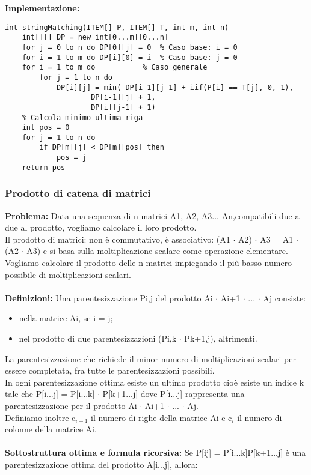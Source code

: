 \documentclass[../cheatSheetAlgoritmi.tex]{subfiles}
\begin{document}
\textbf{Implementazione:}
\begin{lstlisting}[caption=String matching approssimato]
int stringMatching(ITEM[] P, ITEM[] T, int m, int n)
	int[][] DP = new int[0...m][0...n]
	for j = 0 to n do DP[0][j] = 0  % Caso base: i = 0
	for i = 1 to m do DP[i][0] = i  % Caso base: j = 0
	for i = 1 to m do        	% Caso generale 
		for j = 1 to n do
			DP[i][j] = min( DP[i-1][j-1] + iif(P[i] == T[j], 0, 1),	
					DP[i-1][j] + 1,
					DP[i][j-1] + 1)
	% Calcola minimo ultima riga
	int pos = 0 
	for j = 1 to n do
		if DP[m][j] < DP[m][pos] then
			pos = j
	return pos
\end{lstlisting}
\subsubsection{Prodotto di catena di matrici}
\textbf{Problema:} Data una sequenza di n matrici A1, A2, A3... An,compatibili due a due al prodotto, vogliamo calcolare il loro prodotto. \\Il prodotto di matrici: non è commutativo, è associativo: (A1 $\cdot$ A2) $\cdot$ A3 = A1 $\cdot$ (A2 $\cdot$ A3) e si basa sulla moltiplicazione scalare come operazione elementare. Vogliamo calcolare il prodotto delle n matrici impiegando il più basso numero possibile di moltiplicazioni scalari.\\\\
\textbf{Definizioni:} Una parentesizzazione Pi,j del prodotto Ai $\cdot$ Ai+1 $\cdot$ ... $\cdot$ Aj consiste:
\begin{itemize}
	\item nella matrice Ai, se i = j;
	\item nel prodotto di due parentesizzazioni (Pi,k $\cdot$ Pk+1,j), altrimenti.
\end{itemize}
La parentesizzazione che richiede il minor numero di moltiplicazioni scalari per essere completata, fra tutte le parentesizzazioni possibili.\\In ogni parentesizzazione ottima esiste un ultimo prodotto cioè  esiste un indice k tale che P[i...j] = P[i...k] $\cdot$ P[k+1...j] dove P[i...j] rappresenta una parentesizzazione per il prodotto Ai $\cdot$ Ai+1 $\cdot$ ... $\cdot$ Aj.\\Definiamo inoltre c$_{i-1}$ il numero di righe della matrice Ai e c$_{i}$  il numero di colonne della matrice Ai.\\\\
\textbf{Sottostruttura ottima e formula ricorsiva:} Se P[ij] = P[i...k]P[k+1...j] è una parentesizzazione ottima del prodotto A[i...j], allora:
\end{document}
